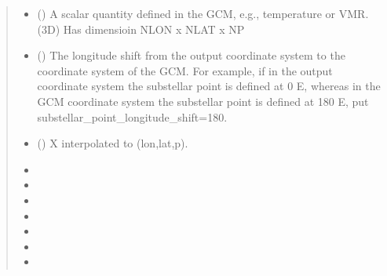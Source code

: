 \documentclass[letterpaper,10pt,english]{sphinxmanual}
\begin{document}
\begin{fulllineitems}
\begin{quote}
\begin{description}
\begin{itemize}
\item {} 
\sphinxAtStartPar
{} () \textendash{} A scalar quantity defined in the GCM, e.g., temperature or VMR. (3D)
Has dimensioin NLON x NLAT x NP

\item {} 
\sphinxAtStartPar
{} () \textendash{} The longitude shift from the output coordinate system to the
coordinate system of the GCM. For example, if in the output
coordinate system the substellar point is defined at 0 E,
whereas in the GCM coordinate system the substellar point is defined
at 180 E, put substellar\_point\_longitude\_shift=180.

\end{itemize}

\sphinxAtStartPar
\begin{itemize}
\item {} 
\sphinxAtStartPar
{} () \textendash{} X interpolated to (lon,lat,p).

\item {} 
\sphinxAtStartPar
{}

\item {} 
\sphinxAtStartPar
{}

\item {} 
\sphinxAtStartPar
{}

\item {} 
\sphinxAtStartPar
{}

\item {} 
\sphinxAtStartPar
{}

\item {} 
\sphinxAtStartPar
{}

\item {} 
\sphinxAtStartPar
{}


\end{itemize}
\end{description}
\end{quote}
\end{fulllineitems}
\end{document}
